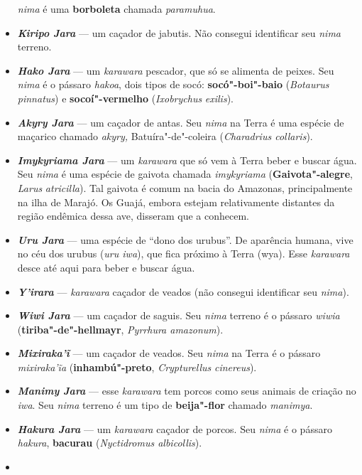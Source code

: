 \begin{itemize}
  \emph{nima} é uma \textbf{borboleta} chamada \emph{paramuhua}.
\item
  \emph{\textbf{Kiripo Jara}} --- um caçador de jabutis. Não consegui
  identificar seu \emph{nima} terreno.
\item
  \textbf{\emph{Hako Jara}} --- um \emph{karawara} pescador, que só se
  alimenta de peixes. Seu \emph{nima} é o pássaro \emph{hakoa}, dois
  tipos de socó: \textbf{socó"-boi"-baio} (\emph{Botaurus pinnatus}) e
  \textbf{socoí"-vermelho} (\emph{Ixobrychus} \emph{exilis}).
\item
  \textbf{\emph{Akyry Jara}} --- um caçador de antas. Seu \emph{nima} na
  Terra é uma espécie de maçarico chamado \emph{akyry,}
  Batuíra"-de"-coleira (\emph{Charadrius collaris}).
\item
  \emph{\textbf{Imykyriama Jara}} --- um \emph{karawara} que só vem à
  Terra beber e buscar água. Seu \emph{nima} é uma espécie de gaivota
  chamada \emph{imykyriama} (\textbf{Gaivota"-alegre}, \emph{Larus}
  \emph{atricilla}). Tal gaivota é comum na bacia do Amazonas,
  principalmente na ilha de Marajó. Os Guajá, embora estejam
  relativamente distantes da região endêmica dessa ave, disseram que a
  conhecem.
\item
  \emph{\textbf{Uru Jara}} --- uma espécie de ``dono dos urubus''. De
  aparência humana, vive no céu dos urubus (\emph{uru iwa}), que fica
  próximo à Terra (wya). Esse \emph{karawara} desce até aqui para beber
  e buscar água.
\item
  \emph{\textbf{Y'irara}} --- \emph{karawara} caçador de veados (não
  consegui identificar seu \emph{nima}).
\item
  \emph{\textbf{Wiwi Jara}} --- um caçador de saguis. Seu \emph{nima}
  terreno é o pássaro \emph{wiwia} (\textbf{tiriba"-de"-hellmayr},
  \emph{Pyrrhura amazonum}).
\item
  \emph{\textbf{Mixiraka'ĩ}} --- um caçador de veados. Seu \emph{nima} na
  Terra é o pássaro \emph{mixiraka'ĩa} (\textbf{inhambú"-preto},
  \emph{Crypturellus} \emph{cinereus}).
\item
  \emph{\textbf{Manimy Jara}} --- esse \emph{karawara} tem porcos como
  seus animais de criação no \emph{iwa}. Seu \emph{nima} terreno é um
  tipo de \textbf{beija"-flor} chamado \emph{manimya}.
\item
  \emph{\textbf{Hakura Jara}} --- um \emph{karawara} caçador de porcos. Seu
  \emph{nima} é o pássaro \emph{hakura}, \textbf{bacurau}
  (\emph{Nyctidromus albicollis}).
\item

\end{itemize}
